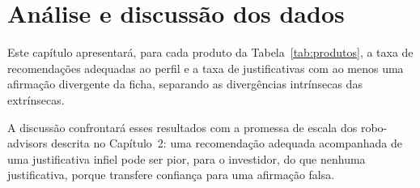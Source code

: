 
\section{Análise e discussão dos dados}

Este capítulo apresentará, para cada produto da Tabela~\ref{tab:produtos}, a
taxa de recomendações adequadas ao perfil e a taxa de justificativas com ao
menos uma afirmação divergente da ficha, separando as divergências intrínsecas
das extrínsecas.

A discussão confrontará esses resultados com a promessa de escala dos
robo-advisors descrita no Capítulo~2: uma recomendação adequada acompanhada de
uma justificativa infiel pode ser pior, para o investidor, do que nenhuma
justificativa, porque transfere confiança para uma afirmação falsa.
